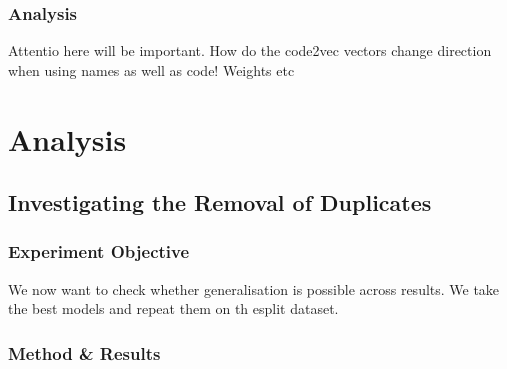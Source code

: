 \subsubsection{Analysis} %

Attentio here will be important. 
How do the code2vec vectors change direction when using names as well as code!
Weights etc

\section{Analysis} %
\label{sec:analysis}


\subsection{Investigating the Removal of Duplicates} %
\label{sub:investigating_the_removal_of_duplicates}

\subsubsection{Experiment Objective} %

We now want to check whether generalisation is possible across results. 
We take the best models and repeat them on th esplit dataset.

\subsubsection{Method \& Results} %


